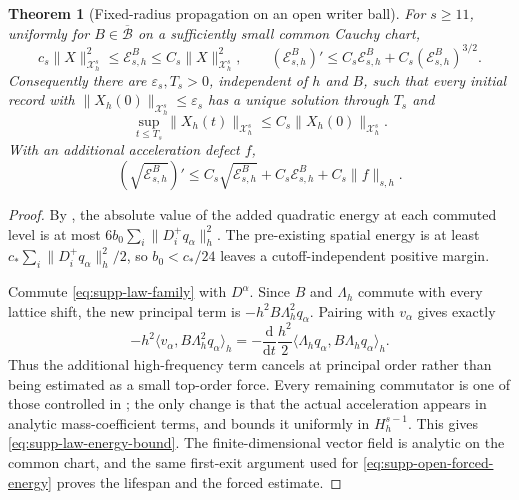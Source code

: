 \documentclass[11pt]{article}
\newtheorem{theorem}{Theorem}[section]
\theoremstyle{definition}
\theoremstyle{remark}
\newcommand{\dd}{\mathrm d}
\begin{document}
\begin{theorem}[Fixed-radius propagation on an open writer ball]
\label{thm:supp-law-stability}
For $s\ge11$, uniformly for $B\in\overline{\mathcal B}$ on a sufficiently
small common Cauchy chart,
\begin{equation}
 c_s\|X\|_{\mathcal X_h^s}^2\le\mathscr E^B_{s,h}
 \le C_s\|X\|_{\mathcal X_h^s}^2,
 \qquad
 (\mathscr E^B_{s,h})'\le C_s\mathscr E^B_{s,h}
                     +C_s(\mathscr E^B_{s,h})^{3/2}.
 \label{eq:supp-law-energy-bound}
\end{equation}
Consequently there are $\varepsilon_s,T_s>0$, independent of $h$ and $B$,
such that every initial record with
$\|X_h(0)\|_{\mathcal X_h^s}\le\varepsilon_s$ has a unique solution through
$T_s$ and
\begin{equation}
 \sup_{t\le T_s}\|X_h(t)\|_{\mathcal X_h^s}\le C_s\|X_h(0)\|_{\mathcal X_h^s}.
 \label{eq:supp-law-lifespan}
\end{equation}
With an additional acceleration defect $f$,
\begin{equation}
 (\sqrt{\mathscr E^B_{s,h}})'
 \le C_s\sqrt{\mathscr E^B_{s,h}}+C_s\mathscr E^B_{s,h}+C_s\|f\|_{s,h}.
 \label{eq:supp-law-forced}
\end{equation}
\end{theorem}
\begin{proof}
By , the absolute value of the added quadratic
energy at each commuted level is at most
$6b_0\sum_i\|D_i^+q_\alpha\|_h^2$.  The pre-existing spatial energy is at
least $c_*\sum_i\|D_i^+q_\alpha\|_h^2/2$, so
$b_0<c_*/24$ leaves a cutoff-independent positive margin.

Commute \eqref{eq:supp-law-family} with $D^\alpha$.  Since $B$ and
$\Lambda_h$ commute with every lattice shift, the new principal term is
$-h^2B\Lambda_h^2q_\alpha$.  Pairing with $v_\alpha$ gives exactly
\[
 -h^2\langle v_\alpha,B\Lambda_h^2q_\alpha\rangle_h
 =-\frac{\dd}{\dd t}\frac{h^2}{2}
       \langle\Lambda_hq_\alpha,B\Lambda_hq_\alpha\rangle_h.
\]
Thus the additional high-frequency term cancels at principal order rather
than being estimated as a small top-order force.  Every remaining commutator
is one of those controlled in ; the only change is
that the actual acceleration appears in analytic mass-coefficient terms, and
 bounds it uniformly in $H_h^{s-1}$.  This gives
\eqref{eq:supp-law-energy-bound}.  The finite-dimensional vector field is
analytic on the common chart, and the same first-exit argument used for
\eqref{eq:supp-open-forced-energy} proves the lifespan and the forced estimate.
\end{proof}
\end{document}
